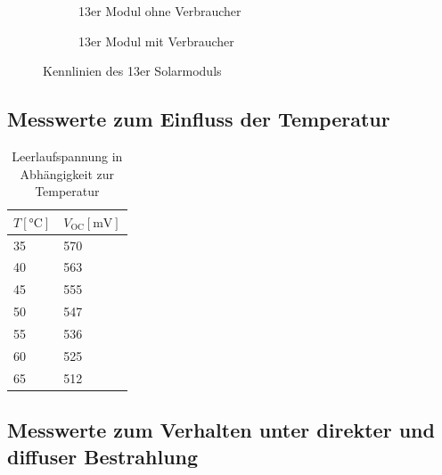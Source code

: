 \documentclass[slug=SZ, room=Hermann-Krone-Bau\,\ Labor\ 1.25,
supervisor=Martin\ Kroll, coursedate=14.\ 11.\ 2019]{../../Lab_Report_LaTeX/lab_report}
\newcommand{\voc}{V_{\text{OC}}}
\begin{document}
\begin{figure}[H]\centering
  \begin{subfigure}[b]{1\textwidth}\centering
    
    \caption{13er Modul ohne Verbraucher}
    \label{diag:hugehellrs}
  \end{subfigure}
  \begin{subfigure}[b]{1\textwidth}\centering
    
    \caption{13er Modul mit Verbraucher}
    \label{diag:hugeverbrrsrp}
  \end{subfigure}
  \caption{Kennlinien des 13er Solarmoduls}
  \label{fig:huge}
\end{figure}

\subsection{Messwerte zum Einfluss der Temperatur}

\begin{table}[H]
        \centering
        \begin{tabular}{l|l}
                \toprule
                \(T [\si{\degreeCelsius}]\) & \(\voc [\si{\milli\volt}]\)\\
                \midrule
                35 & 570 \\
                40 & 563 \\
                45 & 555 \\
                50 & 547 \\
                55 & 536 \\
                60 & 525 \\
                65 & 512
        \end{tabular}
        \caption{Leerlaufspannung in Abhängigkeit zur Temperatur}
        \label{tab:messd}
\end{table}

\subsection{Messwerte zum Verhalten unter direkter und diffuser Bestrahlung}
\end{document}
